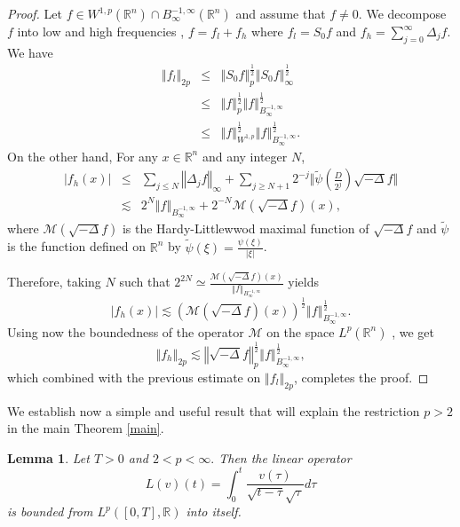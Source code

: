 \documentclass[11pt]{amsart}%
\theoremstyle{plain}
\numberwithin{equation}{section}
\newtheorem{lemma}{Lemma}[section]
\begin{document}
\begin{proof}
Let $f\in W^{1,p}(\mathbb{R}^n)\cap B^{-1,\infty}_\infty (\mathbb{R}^n)$ and assume that $f\neq0$. We decompose $f$ into low and high frequencies , $f=f_l+f_h$ where $f_l=S_0f$ and $f_h=\sum_{j=0}^{\infty}\Delta_j f.$ We have
\begin{eqnarray*}
\left\Vert f_l\right\Vert_{2p}&\leq& \left\Vert S_0f\right\Vert_p^{\frac{1}{2}}\left\Vert S_0f\right\Vert_{\infty}^{\frac{1}{2}}\\
&\leq& \left\Vert f\right\Vert_p^{\frac{1}{2}}\left\Vert f\right\Vert_{B^{-1,\infty}_\infty}^{\frac{1}{2}}\\
&\leq& \left\Vert f\right\Vert_{W^{1,p}}^{\frac{1}{2}}\left\Vert f\right\Vert_{B^{-1,\infty}_\infty}^{\frac{1}{2}}.
\end{eqnarray*}%
On the other hand, For any $x\in \mathbb{R}^n$ and any integer $N$,
\begin{eqnarray*}
\vert f_h(x)\vert&\leq& \sum_{j\leq N}\left\Vert\Delta_j f\right\Vert_{\infty}+\sum_{j\geq N+1}2^{-j}\Vert\tilde{\psi}(\frac{D}{2^j})\sqrt{-\Delta}f\Vert\\
&\lesssim&2^N \left\Vert f\right\Vert_{B^{-1,\infty}_\infty}+2^{-N} \mathcal{M}(\sqrt{-\Delta}f)(x),
\end{eqnarray*}%
where $\mathcal{M}(\sqrt{-\Delta}f)$ is the Hardy-Littlewwod maximal function of $\sqrt{-\Delta}f$ \cite{Ste} and $\tilde{\psi}$ is the function defined on $\mathbb{R}^n$ by $\tilde{\psi}(\xi)=\frac{\psi(\xi)}{\vert\xi\vert}$.
\par\noindent Therefore, taking $N$ such that $2^{2N}\simeq\frac{\mathcal{M}(\sqrt{-\Delta}f)(x)}{\left\Vert f\right\Vert_{B^{-1,\infty}_\infty}}$ yields
$$\vert f_h(x)\vert\lesssim (\mathcal{M}(\sqrt{-\Delta}f)(x))^{\frac{1}{2}} \left\Vert f\right\Vert_{B^{-1,\infty}_\infty}^{\frac{1}{2}}.$$
Using now the boundedness of the operator $\mathcal{M}$ on the space $L^p (\mathbb{R}^n)$ \cite{Ste}, we get
$$\left\Vert f_h\right\Vert_{2p}\lesssim \left\Vert \sqrt{-\Delta}f\right\Vert_p^{\frac{1}{2}}\left\Vert f\right\Vert_{B^{-1,\infty}_\infty }^{\frac{1}{2}},$$
which combined with the previous estimate on $\left\Vert f_l\right\Vert_{2p} $, completes the proof.
\end{proof}
We establish now a  simple and useful result that will explain the restriction $p>2$ in the main Theorem \ref{main}.
\begin{lemma}\label{mey}
Let $T>0$ and $2<p<\infty .$ Then the linear operator%
\[
L(v)(t)=\int_{0}^{t}\frac{v(\tau )}{\sqrt{t-\tau }\sqrt{\tau }}d\tau
\]%
is bounded from $L^{p}([0,T],\mathbb{R})$ into itself.
\end{lemma}
\end{document}
